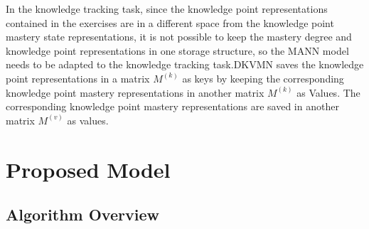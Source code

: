 In the knowledge tracking task, since the knowledge point representations contained in the exercises are in a different space from the knowledge point mastery state representations, it is not possible to keep the mastery degree and knowledge point representations in one storage structure, so the MANN model needs to be adapted to the knowledge tracking task.DKVMN saves the knowledge point representations in a matrix \(M^{(k)}\) as keys by keeping the corresponding knowledge point mastery representations in another matrix \(M^{(k)}\) as Values. The corresponding knowledge point mastery representations are saved in another matrix \(M^{(v)}\) as values.

\section{Proposed Model}
\subsection{Algorithm Overview}

